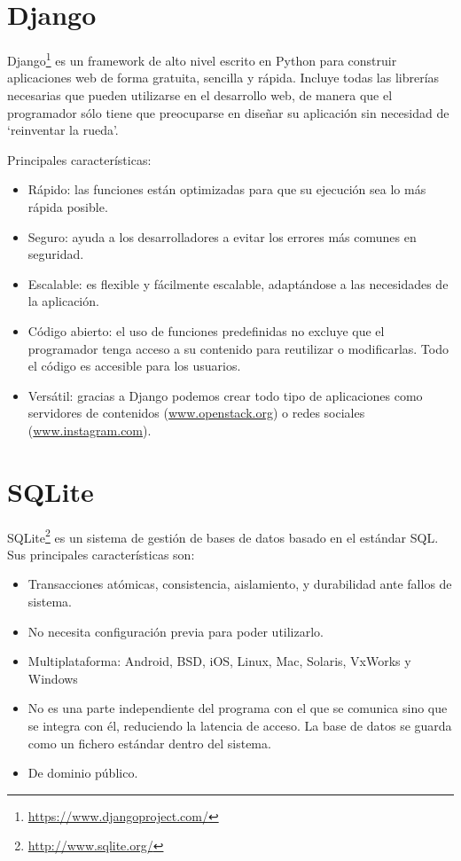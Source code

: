 \documentclass[a4paper, 12pt]{book}
\begin{document}
\section{Django} 
\label{sec:seccion3}
Django\footnote{\url{https://www.djangoproject.com/}} es un framework de alto nivel escrito en Python para construir aplicaciones web de forma gratuita, sencilla y rápida. Incluye todas las librerías necesarias que pueden utilizarse en el desarrollo web, de manera que el programador sólo tiene que preocuparse en diseñar su aplicación sin necesidad de `reinventar la rueda'.

Principales características:
\begin{itemize}
	\item Rápido: las funciones están optimizadas para que su ejecución sea lo más rápida posible.
	\item Seguro: ayuda a los desarrolladores a evitar los errores más comunes en seguridad.  
	\item Escalable: es flexible y fácilmente escalable, adaptándose a las necesidades de la aplicación. 
	\item Código abierto: el uso de funciones predefinidas no excluye que el programador tenga acceso a su contenido para reutilizar o modificarlas. Todo el código es accesible para los usuarios. 
	\item Versátil: gracias a Django podemos crear todo tipo de aplicaciones como servidores de contenidos (\url{www.openstack.org}) o redes sociales (\url{www.instagram.com}).
\end{itemize}
\section{SQLite} 
\label{sec:seccion4}
SQLite\footnote{\url{http://www.sqlite.org/}} es un sistema de gestión de bases de datos basado en el estándar SQL. Sus principales características son:
\begin{itemize}
	\item Transacciones atómicas, consistencia, aislamiento, y durabilidad ante fallos de sistema. 
	\item No necesita configuración previa para poder utilizarlo.
	\item Multiplataforma: Android, BSD, iOS, Linux, Mac, Solaris, VxWorks y Windows
	\item No es una parte independiente del programa con el que se comunica sino que se integra con él, reduciendo la latencia de acceso. La base de datos se guarda como un fichero estándar dentro del sistema. 
	\item De dominio público. 
\end{itemize}
\end{document}
